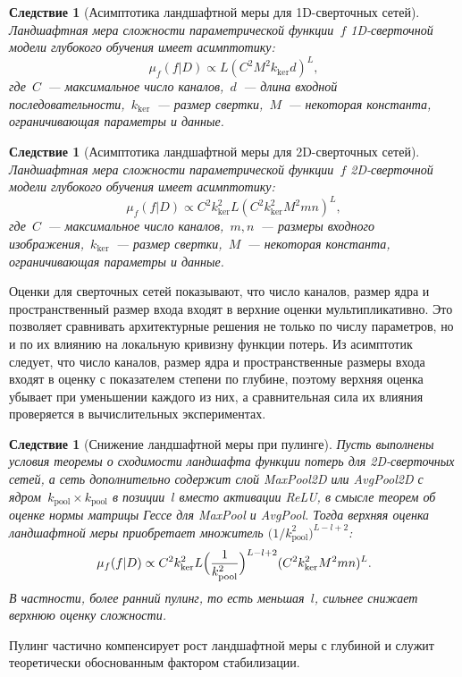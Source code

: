 \documentclass{dissert}
\newtheorem{corollary}[theorem]{Следствие}
\begin{document}
\begin{corollary}[Асимптотика ландшафтной меры для 1D-сверточных сетей]
Ландшафтная мера сложности параметрической функции~$f$ 1D-сверточной модели глубокого обучения имеет асимптотику:
    \[
        \mu_f(f|D) \propto L(C^2M^2k_{\mathrm{ker}}d)^{L},
    \]
    где~$C$~--- максимальное число каналов,~$d$~--- длина входной последовательности,~$k_{\mathrm{ker}}$~--- размер свертки,~$M$~--- некоторая константа, ограничивающая параметры и данные.
\end{corollary}

\begin{corollary}[Асимптотика ландшафтной меры для 2D-сверточных сетей]
Ландшафтная мера сложности параметрической функции~$f$ 2D-сверточной модели глубокого обучения имеет асимптотику:
    \[
        \mu_f(f|D) \propto C^2k_{\mathrm{ker}}^2L(C^2k_{\mathrm{ker}}^2M^2mn)^{L},
    \]
    где~$C$~--- максимальное число каналов,~$m,n$~--- размеры входного изображения,~$k_{\mathrm{ker}}$~--- размер свертки,~$M$~--- некоторая константа, ограничивающая параметры и данные.
\end{corollary}
Оценки для сверточных сетей показывают, что число каналов, размер ядра и пространственный размер входа входят в верхние оценки мультипликативно.
Это позволяет сравнивать архитектурные решения не только по числу параметров, но и по их влиянию на локальную кривизну функции потерь.
Из асимптотик следует, что число каналов, размер ядра и пространственные размеры входа входят в оценку с показателем степени по глубине, поэтому верхняя оценка убывает при уменьшении каждого из них, а сравнительная сила их влияния проверяется в вычислительных экспериментах.

\begin{corollary}[Снижение ландшафтной меры при пулинге]
Пусть выполнены условия теоремы о сходимости ландшафта функции потерь для 2D-сверточных сетей, а сеть дополнительно содержит слой MaxPool2D или AvgPool2D с ядром~$k_{\mathrm{pool}}\times k_{\mathrm{pool}}$ в позиции~$l$ вместо активации ReLU, в смысле теорем об оценке нормы матрицы Гессе для MaxPool и AvgPool.
Тогда верхняя оценка ландшафтной меры приобретает множитель $\bigl(1/k_{\mathrm{pool}}^2\bigr)^{L-l+2}$:
\[
    \mu_f(f|D) \propto C^2k_{\mathrm{ker}}^2L\Bigl(\frac{1}{k_{\mathrm{pool}}^2}\Bigr)^{L-l+2}(C^2k_{\mathrm{ker}}^2M^2mn)^{L}.
\]
В частности, более ранний пулинг, то есть меньшая~$l$, сильнее снижает верхнюю оценку сложности.
\end{corollary}
Пулинг частично компенсирует рост ландшафтной меры с глубиной и служит теоретически обоснованным фактором стабилизации.
\end{document}

